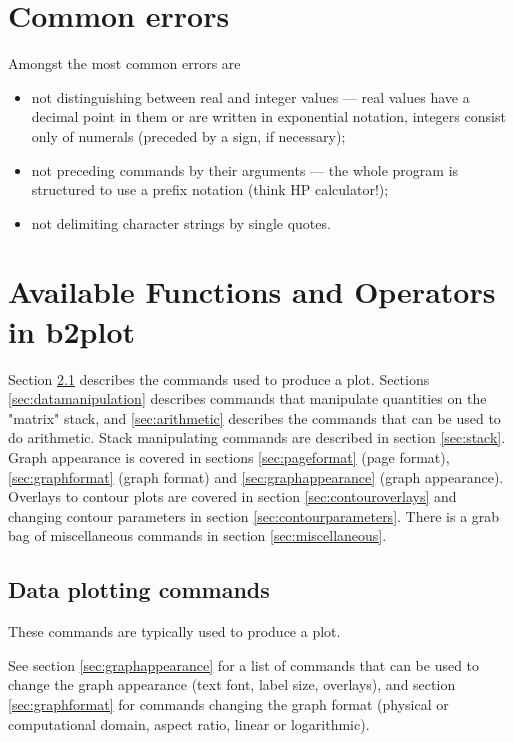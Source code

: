 \documentclass[a4paper,10pt]{report}
\newcommand{\btwoplot}{{\bf b2plot} }
\begin{document}
\section{Common errors}

Amongst the most common errors are
\begin{itemize}
\item not distinguishing between real and integer values --- real
  values have a decimal point in them or are written in exponential
  notation, integers consist only of numerals (preceded by a sign, if
  necessary);
\item not preceding commands by their arguments --- the whole program is
  structured to use a prefix notation (think HP calculator!);
\item not delimiting character strings by single quotes.
\end{itemize}

\section{Available Functions and Operators in \btwoplot }

Section \ref{sec:dataplotting} describes the commands used to produce a
plot.  Sections \ref{sec:datamanipulation} describes commands that manipulate
quantities on the "matrix" stack, and \ref{sec:arithmetic} describes the
commands that can be used to do arithmetic.  Stack manipulating
commands are described in section \ref{sec:stack}.  Graph appearance is covered in
sections \ref{sec:pageformat} (page format), \ref{sec:graphformat} (graph
format) and \ref{sec:graphappearance} (graph appearance).  Overlays to
contour plots are covered in section \ref{sec:contouroverlays} and changing
contour parameters in section \ref{sec:contourparameters}.  There is a grab bag of
miscellaneous commands in section \ref{sec:miscellaneous}.

\subsection{Data plotting commands}\label{sec:dataplotting}

These commands are typically used to produce a plot.

See section \ref{sec:graphappearance} for a list of commands that can be used to
change the graph appearance (text font, label size, overlays), and section
\ref{sec:graphformat} for commands changing the graph format (physical or
computational domain, aspect ratio, linear or logarithmic).
\end{document}
